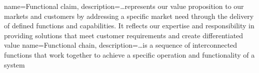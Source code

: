 %
%
{%
	name=Functional claim,%
	description={\dots represents our value proposition to our markets and customers by addressing a specific market need through the delivery of defined functions and capabilities. It reflects our expertise and responsibility in providing solutions that meet customer requirements and create differentiated value}%
}
%
{%
	name=Functional chain,%
	description={\dots is a sequence of interconnected functions that work  together to achieve a specific operation and functionality of a system}%
}
%
%
%
